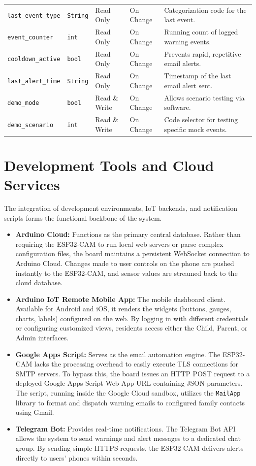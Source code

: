 \documentclass[11pt,a4paper]{report}
\begin{document}
\begin{longtable}{lllp{2.5cm}p{4cm}}
\texttt{last\_event\_type} & \texttt{String} & Read Only & On Change & Categorization code for the last event. \\
\texttt{event\_counter} & \texttt{int} & Read Only & On Change & Running count of logged warning events. \\
\texttt{cooldown\_active} & \texttt{bool} & Read Only & On Change & Prevents rapid, repetitive email alerts. \\
\texttt{last\_alert\_time} & \texttt{String} & Read Only & On Change & Timestamp of the last email alert sent. \\
\texttt{demo\_mode} & \texttt{bool} & Read \& Write & On Change & Allows scenario testing via software. \\
\texttt{demo\_scenario} & \texttt{int} & Read \& Write & On Change & Code selector for testing specific mock events. \\
\end{longtable}
\section{Development Tools and Cloud Services}
The integration of development environments, IoT backends, and notification scripts forms the functional backbone of the system.
\begin{itemize}
    \item \textbf{Arduino Cloud:} Functions as the primary central database. Rather than requiring the ESP32-CAM to run local web servers or parse complex configuration files, the board maintains a persistent WebSocket connection to Arduino Cloud. Changes made to user controls on the phone are pushed instantly to the ESP32-CAM, and sensor values are streamed back to the cloud database.
    \item \textbf{Arduino IoT Remote Mobile App:} The mobile dashboard client. Available for Android and iOS, it renders the widgets (buttons, gauges, charts, labels) configured on the web. By logging in with different credentials or configuring customized views, residents access either the Child, Parent, or Admin interfaces.
    \item \textbf{Google Apps Script:} Serves as the email automation engine. The ESP32-CAM lacks the processing overhead to easily execute TLS connections for SMTP servers. To bypass this, the board issues an HTTP POST request to a deployed Google Apps Script Web App URL containing JSON parameters. The script, running inside the Google Cloud sandbox, utilizes the \texttt{MailApp} library to format and dispatch warning emails to configured family contacts using Gmail.
    \item \textbf{Telegram Bot:} Provides real-time notifications. The Telegram Bot API allows the system to send warnings and alert messages to a dedicated chat group. By sending simple HTTPS requests, the ESP32-CAM delivers alerts directly to users' phones within seconds.
\end{itemize}
\end{document}

